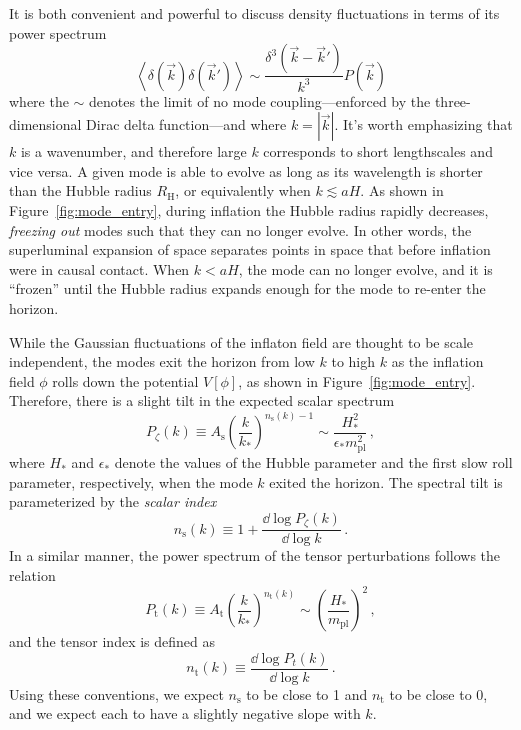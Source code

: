It is both convenient and powerful to discuss density fluctuations in terms of its power spectrum
\begin{equation}
    \left< \delta(\vec{k}) \delta(\vec{k}') \right> \sim \frac{\delta^{3}(\vec{k} - \vec{k}')}{k^{3}} P(\vec{k})
    \label{eq:density_power_spectrum}
\end{equation}
where the $\sim$ denotes the limit of no mode coupling---enforced by the three-dimensional Dirac delta function---and where $k = | \vec{k} |$. It's worth emphasizing that $k$ is a wavenumber, and therefore large $k$ corresponds to short lengthscales and vice versa. A given mode is able to evolve as long as its wavelength is shorter than the Hubble radius $R_{\mathrm{H}}$, or equivalently when $k \lesssim a H$. As shown in Figure~\ref{fig:mode_entry}, during inflation the Hubble radius rapidly decreases, \textit{freezing out} modes such that they can no longer evolve. In other words, the superluminal expansion of space separates points in space that before inflation were in causal contact. When $k < a H$, the mode can no longer evolve, and it is ``frozen'' until the Hubble radius expands enough for the mode to re-enter the horizon. 

While the Gaussian fluctuations of the inflaton field are thought to be scale independent, the modes exit the horizon from low $k$ to high $k$ as the inflation field $\phi$ rolls down the potential $V[\phi]$, as shown in Figure~\ref{fig:mode_entry}. Therefore, there is a slight tilt in the expected scalar spectrum
\begin{equation}
    P_{\zeta}(k) \equiv A_{\mathrm{s}} \left( \frac{k}{k_{*}} \right)^{n_{\mathrm{s}}(k) - 1} \sim \frac{H_{*}^{2}}{\epsilon_{*} m_{\mathrm{pl}}^{2}} \, ,
    \label{eq:scalar_spctrum}
\end{equation}
where $H_{*}$ and $\epsilon_{*}$ denote the values of the Hubble parameter and the first slow roll parameter, respectively, when the mode $k$ exited the horizon. The spectral tilt is parameterized by the \textit{scalar index}
\begin{equation}
    n_{\mathrm{s}}(k) \equiv 1 + \frac{\dd \log P_{\zeta}(k)}{\dd \log k}
    \, .
    \label{eq:scalar_index}
\end{equation}
In a similar manner, the power spectrum of the tensor perturbations follows the relation
\begin{equation}
    P_{\mathrm{t}}(k) \equiv A_{\mathrm{t}} \left( \frac{k}{k_{*}} \right)^{n_{\mathrm{t}}(k)} \sim \left( \frac{H_{*}}{m_{\mathrm{pl}}} \right)^{2} \, ,
    \label{eq:tensor_spectrum}
\end{equation}
and the tensor index is defined as
\begin{equation}
    n_{\mathrm{t}}(k) \equiv \frac{\dd \log P_{t}(k)}{\dd \log k} \, .
    \label{eq:tensor_index}
\end{equation}
Using these conventions, we expect $n_{\mathrm{s}}$ to be close to 1 and $n_{\mathrm{t}}$ to be close to 0, and we expect each to have a slightly negative slope with $k$. 


